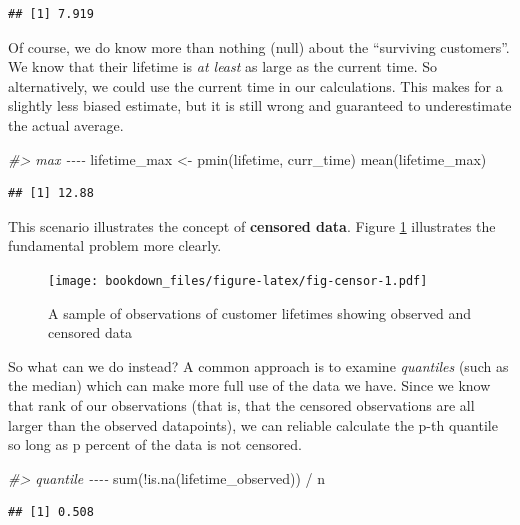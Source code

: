 \documentclass[
]{krantz}
\makeatletter
\newenvironment{Shaded}{\begin{snugshade}}{\end{snugshade}}
\newcommand{\CommentTok}[1]{\textcolor[rgb]{0.37,0.37,0.37}{\textit{#1}}}
\newcommand{\FunctionTok}[1]{\textcolor[rgb]{0,0,0}{#1}}
\newcommand{\NormalTok}[1]{#1}
\newcommand{\OtherTok}[1]{\textcolor[rgb]{0.37,0.37,0.37}{#1}}
\newcommand{\SpecialCharTok}[1]{\textcolor[rgb]{0,0,0}{#1}}
\newenvironment{kframe}{%
\medskip{}
\setlength{\fboxsep}{.8em}
 \def\at@end@of@kframe{}%
 \ifinner\ifhmode%
  \def\at@end@of@kframe{\end{minipage}}%
  \begin{minipage}{\columnwidth}%
 \fi\fi%
 \def\FrameCommand##1{\hskip\@totalleftmargin \hskip-\fboxsep
 \colorbox{shadecolor}{##1}\hskip-\fboxsep
     \hskip-\linewidth \hskip-\@totalleftmargin \hskip\columnwidth}%
 \MakeFramed {\advance\hsize-\width
   \@totalleftmargin\z@ \linewidth\hsize
   \@setminipage}}%
 {\par\unskip\endMakeFramed%
 \at@end@of@kframe}
\renewenvironment{Shaded}{\begin{kframe}}{\end{kframe}}
\makeatother
\begin{document}
\begin{verbatim}
## [1] 7.919
\end{verbatim}

Of course, we do know more than nothing (null) about the ``surviving customers''.
We know that their lifetime is \emph{at least} as large as the current time.
So alternatively, we could use the current time in our calculations.
This makes for a slightly less biased estimate, but it is still wrong and guaranteed to underestimate the actual average.

\begin{Shaded}
\begin{Highlighting}[]
\CommentTok{\#\textgreater{} max {-}{-}{-}{-}}
\NormalTok{lifetime\_max }\OtherTok{\textless{}{-}} \FunctionTok{pmin}\NormalTok{(lifetime, curr\_time)}
\FunctionTok{mean}\NormalTok{(lifetime\_max)}
\end{Highlighting}
\end{Shaded}

\begin{verbatim}
## [1] 12.88
\end{verbatim}

This scenario illustrates the concept of \textbf{censored data}. Figure \ref{fig:fig-censor} illustrates the fundamental problem more clearly.

\begin{figure}
\centering
\texttt{[image: bookdown\_files/figure-latex/fig-censor-1.pdf]}
\caption{\label{fig:fig-censor}A sample of observations of customer lifetimes showing observed and censored data}
\end{figure}

So what can we do instead?
A common approach is to examine \emph{quantiles} (such as the median) which can make more full use of the data we have.
Since we know that rank of our observations (that is, that the censored observations are all larger than the observed datapoints),
we can reliable calculate the p-th quantile so long as p percent of the data is not censored.

\begin{Shaded}
\begin{Highlighting}[]
\CommentTok{\#\textgreater{} quantile {-}{-}{-}{-}}
\FunctionTok{sum}\NormalTok{(}\SpecialCharTok{!}\FunctionTok{is.na}\NormalTok{(lifetime\_observed)) }\SpecialCharTok{/}\NormalTok{ n}
\end{Highlighting}
\end{Shaded}

\begin{verbatim}
## [1] 0.508
\end{verbatim}
\end{document}
